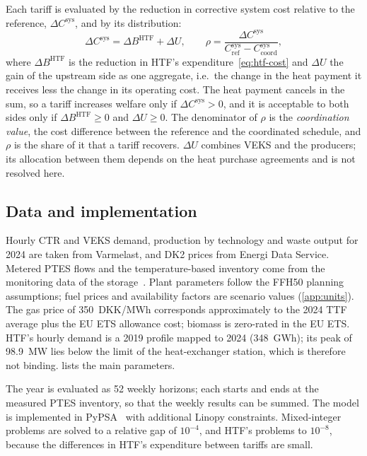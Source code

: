 Each tariff is evaluated by the reduction in corrective system cost relative to the reference, $\Delta C^{\mathrm{sys}}$, and by its distribution:
\begin{equation}
\Delta C^{\mathrm{sys}} = \Delta B^{\mathrm{HTF}} + \Delta U, \qquad
\rho = \frac{\Delta C^{\mathrm{sys}}}{C^{\mathrm{sys}}_{\mathrm{ref}}-C^{\mathrm{sys}}_{\mathrm{coord}}},
\label{eq:evaluation}
\end{equation}
where $\Delta B^{\mathrm{HTF}}$ is the reduction in HTF's expenditure~\eqref{eq:htf-cost} and $\Delta U$ the gain of the upstream side as one aggregate, i.e.\ the change in the heat payment it receives less the change in its operating cost. The heat payment cancels in the sum, so a tariff increases welfare only if $\Delta C^{\mathrm{sys}}>0$, and it is acceptable to both sides only if $\Delta B^{\mathrm{HTF}}\ge0$ and $\Delta U\ge0$. The denominator of $\rho$ is the \emph{coordination value}, the cost difference between the reference and the coordinated schedule, and $\rho$ is the share of it that a tariff recovers. $\Delta U$ combines VEKS and the producers; its allocation between them depends on the heat purchase agreements and is not resolved here.

\subsection{Data and implementation}
\label{sec:data}

Hourly CTR and VEKS demand, production by technology and waste output for 2024 are taken from Varmelast, and DK2 prices from Energi Data Service. Metered PTES flows and the temperature-based inventory come from the monitoring data of the storage~\cite{sifnaios2025performance}. Plant parameters follow the FFH50 planning assumptions; fuel prices and availability factors are scenario values (\cref{app:units}). The gas price of 350~DKK/MWh corresponds approximately to the 2024 TTF average plus the EU ETS allowance cost; biomass is zero-rated in the EU ETS. HTF's hourly demand is a 2019 profile mapped to 2024 (348~GWh); its peak of 98.9~MW lies below the limit of the heat-exchanger station, which is therefore not binding.  lists the main parameters.

The year is evaluated as 52 weekly horizons; each starts and ends at the measured PTES inventory, so that the weekly results can be summed. The model is implemented in PyPSA~\cite{brown2018pypsa} with additional Linopy constraints. Mixed-integer problems are solved to a relative gap of $10^{-4}$, and HTF's problems to $10^{-8}$, because the differences in HTF's expenditure between tariffs are small.

